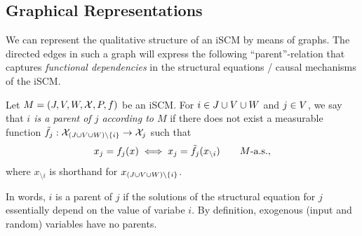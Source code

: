 \subsection{Graphical Representations}

We can represent the qualitative structure of an iSCM by means of graphs.
The directed edges in such a graph will express the following ``parent''-relation that captures \emph{functional dependencies} in the structural equations / causal mechanisms of the iSCM.
\begin{Def}\label{def:scm_parent}
  Let $M = \left ( J, V, W, \mathcal{X}, P, f \right )$ be an iSCM.
  For $i \in J \cup V \cup W$ and $j \in V$, we say that
  \emph{$i$ is a parent of $j$ according to $M$} if there does not exist a measurable function 
  $\tilde f_j : \mathcal{X}_{(J\cup V\cup W) \setminus \{i\}} \to \mathcal{X}_j$
  such that
  $$x_j = f_j(x) \iff x_j = \tilde f_j(x_{\setminus i}) \qquad M\text{-a.s.},$$
  where $x_{\setminus i}$ is shorthand for $x_{(J\cup V\cup W)\setminus\{i\}}$.
\end{Def}
In words, $i$ is a parent of $j$ if the solutions of the structural equation for $j$ essentially depend on the value of variabe $i$.
By definition, exogenous (input and random) variables have no parents.

